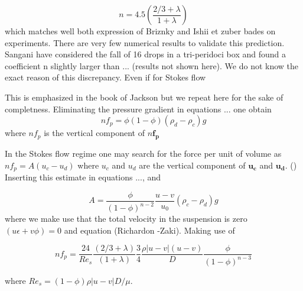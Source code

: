 \begin{equation}
n = 4.5\left(\frac{2/3+\lambda}{1+\lambda}\right)
\end{equation} 
which matches well both expression of Briznky and Ishii et zuber bades on experiments. There are very few numerical results to validate this prediction. Sangani have considered the fall of 16 drops in a tri-peridoci box and found a coefficient n slightly larger than ... (results not shown here). We do not know the exact reason of this discrepancy. Even if for Stokes flow  


This is emphasized in the book of Jackson but we repeat here for the sake of completness. Eliminating the pressure gradient in equations ... one obtain 
\begin{equation}
nf_p = \phi(1-\phi)(\rho_d -\rho _c)g
\end{equation}
where $nf_p$ is the vertical component of $n\mathbf{f_p}$

 In the Stokes flow regime one may search for the force per unit of volume as $nf_p = A (u_c -u_d)$ where $u_c$ and $u_d$ are the vertical component of $\mathbf{u_c}$ and $\mathbf{u_d}$. () Inserting this estimate in equations ...,  and 

\begin{equation}
A = \frac{\phi}{(1-\phi)^{n-2}} \frac{u-v}{u_0} (\rho_c -\rho_d)g
\end{equation}
where we make use that the total velocity in the suspension is zero $(u\epsilon + v\phi)=0$ and equation (Richardon -Zaki). Making use of 



\begin{equation}
nf_p = \frac{24}{Re_s}\frac{(2/3+\lambda)}{(1+\lambda)}\frac{3}{4}\frac{\rho |u-v|(u-v)}{D}\frac{\phi}{(1-\phi)^{n-3}}
\end{equation}



where $Re_s = (1-\phi)\rho |u-v| D/\mu$.








